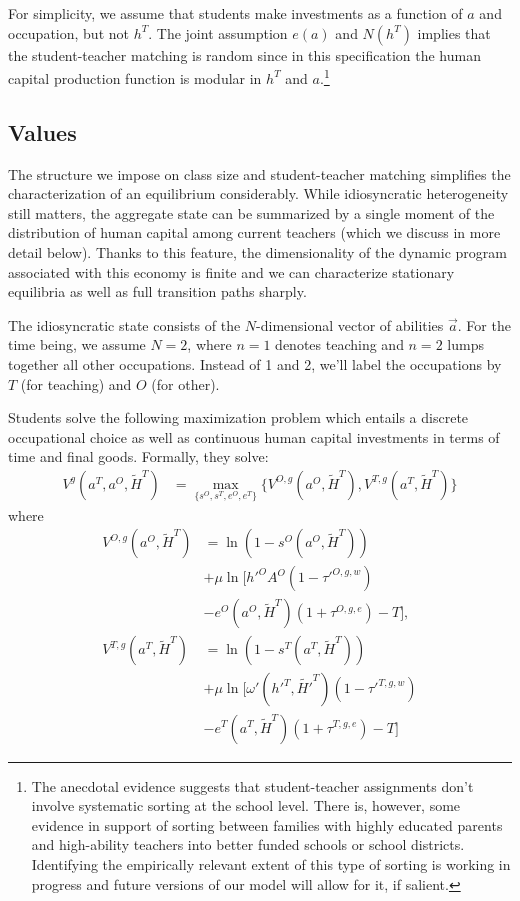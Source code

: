 \documentclass[onehalfspacing,11pt]{article}
\begin{document}
For simplicity, we assume that students make investments as a function of $a$ and occupation, but not $h^T$. The joint assumption $e(a)$ and $N(h^T)$ implies that the student-teacher matching is random since in this specification the human capital production function is modular in $h^T$ and $a$.\footnote{The anecdotal evidence suggests that student-teacher assignments don't involve systematic sorting at the school level. There is, however, some evidence in support of sorting between families with highly educated parents and high-ability teachers into better funded schools or school districts. Identifying the empirically relevant extent of this type of sorting is working in progress and future versions of our model will allow for it, if salient.}

\subsection{Values}
The structure we impose on class size and student-teacher matching simplifies the characterization of an equilibrium considerably. While idiosyncratic heterogeneity still matters, the aggregate state can be summarized by a single moment of the distribution of human capital among current teachers (which we discuss in more detail below). Thanks to this feature, the dimensionality of the dynamic program associated with this economy is finite and we can characterize stationary equilibria as well as full transition paths sharply.

The idiosyncratic state consists of the $N$-dimensional vector of abilities $\vec{a}$. For the time being, we assume $N=2$, where $n=1$ denotes teaching and $n=2$ lumps together all other occupations. Instead of 1 and 2, we'll label the occupations by $T$ (for teaching) and $O$ (for other).

Students solve the following maximization problem which entails a discrete occupational choice as well as continuous human capital investments in terms of time and final goods. Formally, they solve:
\begin{align*}
V^g(a^T,a^O,\widetilde{H}^T) & = \max_{\{s^{O},s^{T},e^{O},e^{T}\}} \bigg\{ V^{O,g}(a^O,\widetilde{H}^T), V^{T,g}(a^T,\widetilde{H}^T) \bigg\}
\end{align*}
where
\begin{align*}
V^{O,g}(a^O,\widetilde{H}^T) & = \ln\left(1-s^O\left(a^O,\widetilde{H}^T\right)\right) \\
& + \mu \ln \Big[ {{h'}^{O}} A^O(1-{{\tau'}^{O,g,w}}) \\
& - e^O(a^O,\widetilde{H}^T)(1+\tau^{O,g,e}) - T \Big],  \\
V^{T,g}(a^T,\widetilde{H}^T) & = \ln\left(1-s^T\left(a^T,\widetilde{H}^T\right)\right)  \\
& + \mu \ln \Big[ \omega'({{h'}^{T}},{\widetilde{H'}^{T}})(1-{{\tau'}^{T,g,w}})  \\
& - e^T(a^T,\widetilde{H}^T)(1+\tau^{T,g,e}) - T \Big] 
\end{align*}
\end{document}
